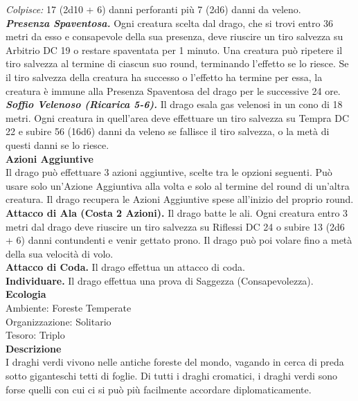 \begin{multicols}{2}
\emph{Colpisce:} 17 (2d10 + 6) danni perforanti più 7 (2d6) danni da veleno.\\
\emph{\textbf{Presenza Spaventosa.}} Ogni creatura scelta dal drago, che si trovi entro 36 metri da esso e consapevole della sua presenza, deve riuscire un tiro salvezza su Arbitrio DC  19 o restare spaventata per 1 minuto. Una creatura può ripetere il tiro salvezza al termine di ciascun suo round, terminando l'effetto se lo riesce. Se il tiro salvezza della creatura ha successo o l'effetto ha termine per essa, la creatura è immune alla Presenza Spaventosa del drago per le successive 24 ore.\\
\emph{\textbf{Soffio Velenoso (Ricarica 5-6).}} Il drago esala gas velenosi in un cono di 18 metri. Ogni creatura in quell'area deve effettuare un tiro salvezza su Tempra DC  22 e subire 56 (16d6) danni da veleno se fallisce il tiro salvezza, o la metà di questi danni se lo riesce.\\
\textbf{Azioni Aggiuntive}\\
Il drago può effettuare 3 azioni aggiuntive, scelte tra le opzioni seguenti. Può usare solo un'Azione Aggiuntiva alla volta e solo al termine del round di un'altra creatura. Il drago recupera le Azioni Aggiuntive spese all'inizio del proprio round.
\textbf{Attacco di Ala (Costa 2 Azioni).} Il drago batte le ali. Ogni creatura entro 3 metri dal drago deve riuscire un tiro salvezza su Riflessi DC  24 o subire 13 (2d6 + 6) danni contundenti e venir gettato prono. Il drago può poi volare fino a metà della sua velocità di volo.\\
\textbf{Attacco di Coda.} Il drago effettua un attacco di coda.\\
\textbf{Individuare.} Il drago effettua una prova di Saggezza (Consapevolezza).\\
\textbf{Ecologia}\\
Ambiente: Foreste Temperate\\
Organizzazione: Solitario\\
Tesoro: Triplo\\
\textbf{Descrizione}\\
I draghi verdi vivono nelle antiche foreste del mondo, vagando in cerca di preda sotto giganteschi tetti di foglie. Di tutti i draghi cromatici, i draghi verdi sono forse quelli con cui ci si può più facilmente accordare diplomaticamente.\\


\end{multicols}
